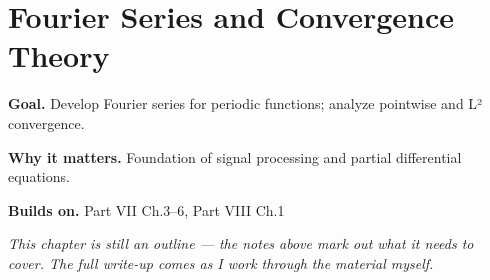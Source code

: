 \chapter{Fourier Series and Convergence Theory}
\label{ch:08-complex-analysis-and-harmonic-analysis-05}

\begin{chapterintro}
\textbf{Goal.} Develop Fourier series for periodic functions; analyze pointwise and L² convergence.

\textbf{Why it matters.} Foundation of signal processing and partial differential equations.

\textbf{Builds on.} Part VII Ch.3–6, Part VIII Ch.1
\end{chapterintro}

\textit{This chapter is still an outline --- the notes above mark out what it needs to cover. The full write-up comes as I work through the material myself.}
